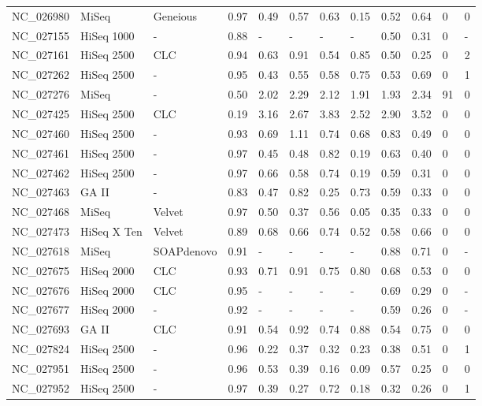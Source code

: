 \begin{table}[ht]
\begin{tabular}{llllllllllll}
  NC\_026980 & MiSeq & Geneious & 0.97 & 0.49 & 0.57 & 0.63 & 0.15 & 0.52 & 0.64 &   0 &     0 \\ 
  NC\_027155 & HiSeq 1000 & - & 0.88 & - & - & - & - & 0.50 & 0.31 &   0 & - \\ 
  NC\_027161 & HiSeq 2500 & CLC & 0.94 & 0.63 & 0.91 & 0.54 & 0.85 & 0.50 & 0.25 &   0 &     2 \\ 
  NC\_027262 & HiSeq 2500 & - & 0.95 & 0.43 & 0.55 & 0.58 & 0.75 & 0.53 & 0.69 &   0 &     1 \\ 
  NC\_027276 & MiSeq & - & 0.50 & 2.02 & 2.29 & 2.12 & 1.91 & 1.93 & 2.34 &  91 &     0 \\ 
  NC\_027425 & HiSeq 2500 & CLC & 0.19 & 3.16 & 2.67 & 3.83 & 2.52 & 2.90 & 3.52 &   0 &     0 \\ 
  NC\_027460 & HiSeq 2500 & - & 0.93 & 0.69 & 1.11 & 0.74 & 0.68 & 0.83 & 0.49 &   0 &     0 \\ 
  NC\_027461 & HiSeq 2500 & - & 0.97 & 0.45 & 0.48 & 0.82 & 0.19 & 0.63 & 0.40 &   0 &     0 \\ 
  NC\_027462 & HiSeq 2500 & - & 0.97 & 0.66 & 0.58 & 0.74 & 0.19 & 0.59 & 0.31 &   0 &     0 \\ 
  NC\_027463 & GA II & - & 0.83 & 0.47 & 0.82 & 0.25 & 0.73 & 0.59 & 0.33 &   0 &     0 \\ 
  NC\_027468 & MiSeq & Velvet & 0.97 & 0.50 & 0.37 & 0.56 & 0.05 & 0.35 & 0.33 &   0 &     0 \\ 
  NC\_027473 & HiSeq X Ten & Velvet & 0.89 & 0.68 & 0.66 & 0.74 & 0.52 & 0.58 & 0.66 &   0 &     0 \\ 
  NC\_027618 & MiSeq & SOAPdenovo & 0.91 & - & - & - & - & 0.88 & 0.71 &   0 & - \\ 
  NC\_027675 & HiSeq 2000 & CLC & 0.93 & 0.71 & 0.91 & 0.75 & 0.80 & 0.68 & 0.53 &   0 &     0 \\ 
  NC\_027676 & HiSeq 2000 & CLC & 0.95 & - & - & - & - & 0.69 & 0.29 &   0 & - \\ 
  NC\_027677 & HiSeq 2000 & - & 0.92 & - & - & - & - & 0.59 & 0.26 &   0 & - \\ 
  NC\_027693 & GA II & CLC & 0.91 & 0.54 & 0.92 & 0.74 & 0.88 & 0.54 & 0.75 &   0 &     0 \\ 
  NC\_027824 & HiSeq 2500 & - & 0.96 & 0.22 & 0.37 & 0.32 & 0.23 & 0.38 & 0.51 &   0 &     1 \\ 
  NC\_027951 & HiSeq 2500 & - & 0.96 & 0.53 & 0.39 & 0.16 & 0.09 & 0.57 & 0.25 &   0 &     0 \\ 
  NC\_027952 & HiSeq 2500 & - & 0.97 & 0.39 & 0.27 & 0.72 & 0.18 & 0.32 & 0.26 &   0 &     1 \\ 

\end{tabular}
\end{table}
